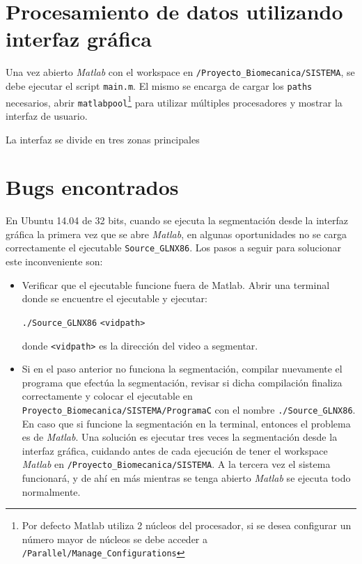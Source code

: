 \section{Procesamiento de datos utilizando interfaz gráfica}
 
 Una vez abierto \textit{Matlab} con el workspace en \texttt{/Proyecto\_Biomecanica/SISTEMA}, se debe ejecutar el script \texttt{main.m}. El mismo se encarga de cargar los \texttt{paths} necesarios, abrir \texttt{matlabpool}\footnote{Por defecto Matlab utiliza 2 núcleos del procesador, si se desea configurar un número mayor de núcleos se debe acceder a \texttt{/Parallel/Manage\_Configurations} } para utilizar múltiples procesadores y mostrar la interfaz de usuario.
 
 
 La interfaz se divide en tres zonas principales
 
 
 \section{Bugs encontrados}
 
 En Ubuntu 14.04 de 32 bits, cuando se ejecuta la segmentación desde la interfaz gráfica la primera vez que se abre \textit{Matlab}, en algunas oportunidades no se carga correctamente el ejecutable \texttt{Source\_GLNX86}. Los pasos a seguir para solucionar este inconveniente son:
 \begin{itemize}
 \item Verificar que el ejecutable funcione fuera de Matlab. Abrir una terminal donde se encuentre el ejecutable y ejecutar:
 \begin{center}
 \texttt{./Source\_GLNX86} \hspace{0.05cm}   \texttt{<vidpath>}
 \end{center} donde \texttt{<vidpath>} es la dirección del video a segmentar.
 \item Si en el paso anterior no funciona la segmentación, compilar nuevamente el programa que efectúa la segmentación, revisar si dicha compilación finaliza correctamente y colocar el ejecutable en\\ \texttt{Proyecto\_Biomecanica/SISTEMA/ProgramaC} con el nombre \texttt{./Source\_GLNX86}. En caso que si funcione la segmentación en la terminal, entonces el problema es de \textit{Matlab}. Una solución es ejecutar tres veces la segmentación desde la interfaz gráfica, cuidando antes de cada ejecución de tener el workspace \textit{Matlab} en \texttt{/Proyecto\_Biomecanica/SISTEMA}. A la tercera vez el sistema funcionará, y de ahí en más mientras se tenga abierto \textit{Matlab} se ejecuta todo normalmente.
 \end{itemize}
  